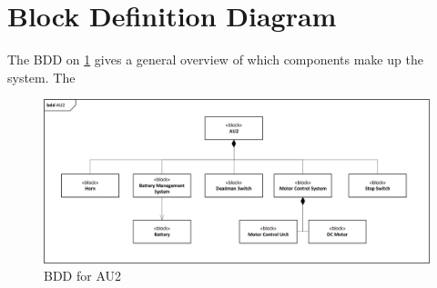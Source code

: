 \section{Block Definition Diagram}
The BDD on \ref{fig:BDD} gives a general overview of which components make up the system. The 

\begin{figure}[H]
	\centering
	\includegraphics[width=1\linewidth]{Architecture/Diagrams/BDD_AU2}
	\caption{BDD for AU2}
	\label{fig:BDD}
\end{figure}